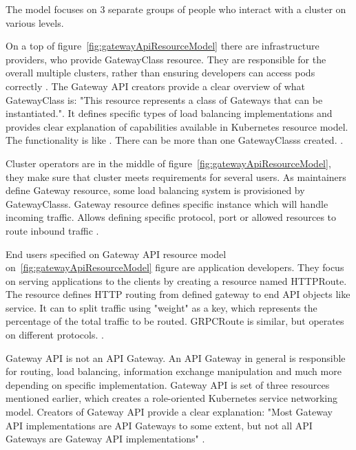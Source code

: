 The model focuses on 3 separate groups of people who interact with a cluster on various levels. 

On a top of figure~\ref{fig:gatewayApiResourceModel} there are infrastructure providers, who provide GatewayClass resource. They are responsible for the overall multiple clusters, rather than ensuring developers can access pods correctly \cite{KubernetesGatewayAPI}. The Gateway API creators provide a clear overview of what GatewayClass is: "This resource represents a class of Gateways that can be instantiated.". It defines specific types of load balancing implementations and provides clear explanation of capabilities available in Kubernetes resource model. The functionality is like \textit{} \cite{KubernetesGatewayAPI} \cite{KubernetesGatewayClass}. There can be more than one GatewayClasss created. \cite{KubernetesGatewayAPI}. 


Cluster operators are in the middle of figure~\ref{fig:gatewayApiResourceModel}, they make sure that cluster meets requirements for several users. As maintainers define Gateway resource, some load balancing system is provisioned by GatewayClasss. Gateway resource defines specific instance which will handle incoming traffic. Allows defining specific protocol, port or allowed resources to route inbound traffic \cite{KubernetesGatewayAPI} \cite{KubernetesGateway}.

End users specified on Gateway API resource model on~\ref{fig:gatewayApiResourceModel} figure are application developers. They focus on serving applications to the clients by creating a resource named HTTPRoute. The resource defines HTTP routing from defined gateway to end API objects like service. It can to split traffic using "weight" as a key, which represents the percentage of the total traffic to be routed. GRPCRoute is similar, but operates on different protocols. \cite{KubernetesGatewayAPI} \cite{KubernetesHTTPRoute}. 



Gateway API is not an API Gateway. An API Gateway in general is responsible for routing, load balancing, information exchange manipulation and much more depending on specific implementation. Gateway API is set of three resources mentioned earlier, which creates a role-oriented Kubernetes service networking model. Creators of Gateway API provide a clear explanation: "Most Gateway API implementations are API Gateways to some extent, but not all API Gateways are Gateway API implementations" \cite{KubernetesGatewayAPI}. 

